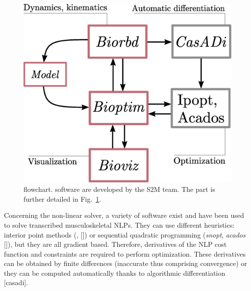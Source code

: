 \begin{figure}[t!]
\centering
\includegraphics[width=0.9\columnwidth]{figures/dependencies.eps}
\caption{\bioptim {} flowchart.  software are developed by the S2M team. The \bioptim part is further detailed in Fig.~\ref{fig:dependencies}.}
\label{fig:dependencies}
\vspace*{-0.5cm}
\end{figure}

Concerning the non-linear solver, a variety of software exist and have been used to solve transcribed musculoskeletal NLPs.
They can use different heuristics: interior point methods (\textit{}, [\addref]) or sequential quadratic programming (\textit{snopt}, \textit{acados} [\addref]), but they are all gradient based.
Therefore, derivatives of the NLP cost function and constraints are required to perform optimization.
These derivatives can be obtained by finite differences (inaccurate thus comprising convergence) or they can be computed automatically thanks to algorithmic differentiation [casadi].

